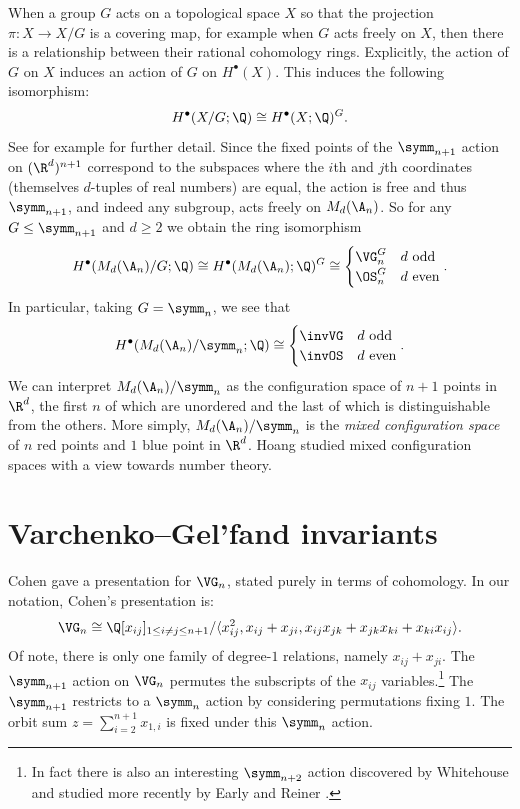 \documentclass{amsart}
\begin{document}
When a group $G$ acts on a topological space $X$ so that the projection $\pi: X \to X/G$ is a covering map, for example when $G$ acts freely on $X$, then there is a relationship between their rational cohomology rings.
Explicitly, the action of $G$ on $X$ induces an action of $G$ on $H^\bullet(X)$.
This induces the following isomorphism:
\[H^\bullet(X/G;\Q) \cong H^\bullet(X;\Q)^G.\]
See for example \cite[\S~3.G]{hatcher} for further detail.
Since the fixed points of the $\symm_{n+1}$ action on $(\R^d)^{n+1}$ correspond to the subspaces where the $i$th and $j$th coordinates (themselves $d$-tuples of real numbers) are equal, the action is free and thus $\symm_{n+1}$, and indeed any subgroup, acts freely on $M_d(\A_n)$. 
So for any $G \leq \symm_{n+1}$ and $d \geq 2$ we obtain the ring isomorphism
\[H^\bullet(M_d(\A_n)/G;\Q) \cong H^\bullet(M_d(\A_n);\Q)^G \cong \begin{cases}
\VG_n^G & \text{$d$ odd}\\
\OS_n^G & \text{$d$ even}\\
\end{cases}.\]
In particular, taking $G = \symm_n$, we see that
\begin{equation}
    H^\bullet(M_d(\A_n)/\symm_n;\Q) \cong
    \begin{cases}
    \invVG & \text{$d$ odd}\\
    \invOS & \text{$d$ even}\\
    \end{cases}.
\end{equation}
We can interpret $M_d(\A_n)/\symm_n$ as the configuration space of $n+1$ points in $\R^d$, the first $n$ of which are unordered and the last of which is distinguishable from the others.
More simply, $M_d(\A_n)/\symm_n$ is the \textit{mixed configuration space} of $n$ red points and $1$ blue point in $\R^d$.
Hoang \cite{hoang-b,hoang-char} studied mixed configuration spaces with a view towards number theory.

\section{Varchenko--Gel'fand invariants}\label{sec:VGInvariants}


Cohen \cite[Chapter~III]{cohen-lada-may} gave a presentation for $\VG_n$, stated purely in terms of cohomology.
In our notation, Cohen's presentation is:
\begin{equation}\label{eqn:CohenVGPresentation}
\VG_n \cong \Q[x_{ij}]_{1 \leq i \neq j \leq n+1}/\langle x_{ij}^2, x_{ij} + x_{ji}, x_{ij}x_{jk} + x_{jk}x_{ki} + x_{ki}x_{ij}\rangle.
\end{equation}
Of note, there is only one family of degree-$1$ relations, namely $x_{ij} + x_{ji}$.
The $\symm_{n+1}$ action on $\VG_n$ permutes the subscripts of the $x_{ij}$ variables.\footnote{In fact there is also an interesting $\symm_{n+2}$ action discovered by Whitehouse \cite{whitehouse} and studied more recently by Early and Reiner \cite{early-reiner}.}
The $\symm_{n+1}$ restricts to a $\symm_n$ action by considering permutations fixing $1$.
The orbit sum $z=\sum_{i=2}^{n+1} x_{1,i}$ is fixed under this $\symm_n$ action.
\end{document}
